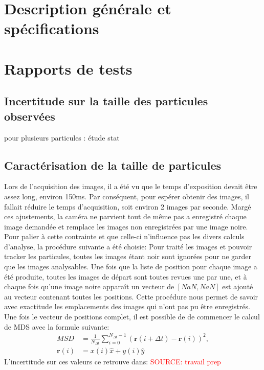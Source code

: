 \documentclass[11pt,letterpaper]{article}
\begin{document}
\section{Description générale et spécifications}

\section{Rapports de tests}

\subsection{Incertitude sur la taille des particules observées}

pour plusieurs particules : étude stat

\subsection{Caractérisation de la taille de particules}
Lors de l'acquisition des images, il a été vu que le temps d'exposition devait être assez long, environ 150ms. Par conséquent, pour espérer 
obtenir des images, il fallait réduire le temps d'acquisition, soit environ 2 images par seconde. Margé ces ajustements, la caméra ne parvient tout de même
pas a enregistré chaque image demandée et remplace les images non enregistrées par une image noire. Pour palier à cette contrainte et que celle-ci n'influence pas les divers calculs d'analyse,
 la procédure suivante a été choisie: 
Pour traité les images et pouvoir tracker les particules, toutes les images étant noir sont ignorées pour ne garder que les images analysables.
Une fois que la liste de position pour chaque image a été produite, toutes les images de départ sont toutes revues une par une, et à chaque fois qu'une
image noire apparaît un vecteur de $\left [ NaN ,NaN \right ]$ est ajouté au vecteur contenant toutes les positions.
 Cette procédure nous permet de savoir avec exactitude les emplacements des images qui n'ont pas pu être enregistrés. Une fois le vecteur de positions 
 complet, il est possible de de commencer le calcul de MDS avec la formule suivante: 
 \begin{align}
  MSD &= \frac{1}{N_{\Delta t}} \sum_{i=0}^{N_{\Delta t} - 1} \left( \mathbf{r}(i+\Delta t) - \mathbf{r}(i) \right)^2,\\ 
  \mathbf{r}(i) &= x(i)\hat{x}+ y(i)\hat{y}
\end{align}
L'incertitude sur ces valeurs ce retrouve dans:
\textcolor{red}{SOURCE: travail prep}
\end{document}
